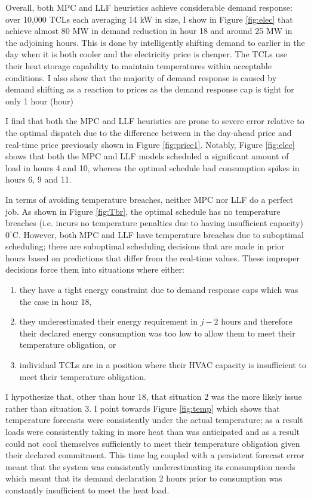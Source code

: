 \documentclass[journal]{IEEEtran}
\begin{document}
Overall, both MPC and LLF heuristics achieve considerable demand response: over 10,000 TCLs each averaging 14 kW in size, I show in Figure \ref{fig:elec} that achieve almost 80 MW in demand reduction in hour 18 and around 25 MW in the adjoining hours. This is done by intelligently shifting demand to earlier in the day when it is both cooler and the electricity price is cheaper. The TCLs use their heat storage capability to maintain temperatures within acceptable conditions. I also show that the majority of demand response is caused by demand shifting as a reaction to prices as the demand response cap is tight for only 1 hour (hour)

I find that both the MPC and LLF heuristics are prone to severe error relative to the optimal dispatch due to the difference between in the day-ahead price and real-time price previously shown in Figure \ref{fig:price1}. Notably, Figure \ref{fig:elec} shows that both the MPC and LLF models scheduled a significant amount of load in hours 4 and 10, whereas the optimal schedule had consumption spikes in hours 6, 9 and 11.

In terms of avoiding temperature breaches, neither MPC nor LLF do a perfect job. As shown in Figure \ref{fig:Tbr}, the optimal schedule has no temperature breaches (i.e. incurs no temperature penalties due to having insufficient capacity) $0^\circ$C. However, both MPC and LLF have temperature breaches due to suboptimal scheduling; there are suboptimal scheduling decisions that are made in prior hours based on predictions that differ from the real-time values. These improper decisions force them into situations where either:
\begin{enumerate}
  \item they have a tight energy constraint due to demand response caps which was the case in hour 18,
  \item	they underestimated their energy requirement in $j-2$ hours and therefore their declared energy consumption was too low to allow them to meet their temperature obligation, or
  \item individual TCLs are in a position where their HVAC capacity is insufficient to meet their temperature obligation.
\end{enumerate}
I hypothesize that, other than hour 18, that situation 2 was the more likely issue rather than situation 3. I point towards Figure \ref{fig:temp} which shows that temperature forecasts were consistently under the actual temperature; as a result loads were consistently taking in more heat than was anticipated and as a result could not cool themselves sufficiently to meet their temperature obligation given their declared commitment. This time lag coupled with a persistent forecast error meant that the system was consistently underestimating its consumption needs which meant that its demand declaration 2 hours prior to consumption was constantly insufficient to meet the heat load. 
\end{document}
